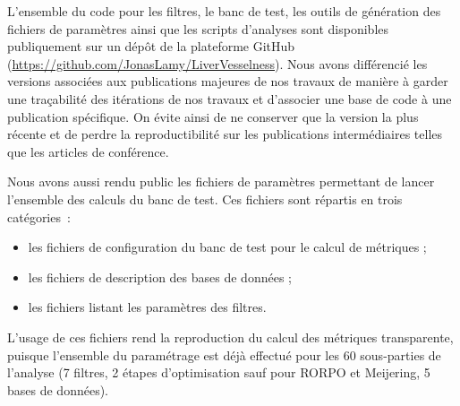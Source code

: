 L'ensemble du code pour les filtres, le banc de test, les outils de génération des fichiers de paramètres ainsi que les scripts d'analyses sont disponibles publiquement sur un dépôt de la plateforme GitHub (\url{https://github.com/JonasLamy/LiverVesselness}). Nous avons différencié les versions associées aux publications majeures de nos travaux de manière à garder une traçabilité des itérations de nos travaux et d'associer une base de code à une publication spécifique. On évite ainsi de ne conserver que la version la plus récente et de perdre la reproductibilité sur les publications intermédiaires telles que les articles de conférence.

Nous avons aussi rendu public les fichiers de paramètres permettant de lancer l'ensemble des calculs du banc de test. Ces fichiers sont répartis en trois catégories~: 
\begin{itemize}
\item les fichiers de configuration du banc de test pour le calcul de métriques ;
\item les fichiers de description des bases de données ;
\item les fichiers listant les paramètres des filtres.  
\end{itemize}
L'usage de ces fichiers rend la reproduction du calcul des métriques transparente, puisque l'ensemble du paramétrage est déjà effectué pour les 60 sous-parties de l'analyse (7 filtres, 2 étapes d'optimisation sauf pour RORPO et Meijering, 5 bases de données).

